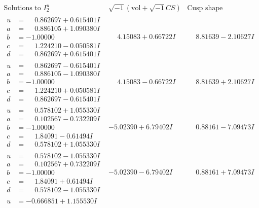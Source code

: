 \documentclass[1p]{elsarticle_modified}
\theoremstyle{definition}
\newcommand{\I}{\sqrt{-1}}
\begin{document}
$$\begin{array}{c|c|c}  
\text{Solutions to }I^u_{2}& \I (\text{vol} + \sqrt{-1}CS) & \text{Cusp shape}\\
 \hline 
\begin{aligned}
u &= \phantom{-}0.862697 + 0.615401 I \\
a &= \phantom{-}0.886105 + 1.090380 I \\
b &= -1.00000\phantom{ +0.000000I} \\
c &= \phantom{-}1.224210 - 0.050581 I \\
d &= \phantom{-}0.862697 + 0.615401 I\end{aligned}
 & \phantom{-}4.15083 + 0.66722 I & \phantom{-}8.81639 - 2.10627 I \\ \hline\begin{aligned}
u &= \phantom{-}0.862697 - 0.615401 I \\
a &= \phantom{-}0.886105 - 1.090380 I \\
b &= -1.00000\phantom{ +0.000000I} \\
c &= \phantom{-}1.224210 + 0.050581 I \\
d &= \phantom{-}0.862697 - 0.615401 I\end{aligned}
 & \phantom{-}4.15083 - 0.66722 I & \phantom{-}8.81639 + 2.10627 I \\ \hline\begin{aligned}
u &= \phantom{-}0.578102 + 1.055330 I \\
a &= \phantom{-}0.102567 - 0.732209 I \\
b &= -1.00000\phantom{ +0.000000I} \\
c &= \phantom{-}1.84091 - 0.61494 I \\
d &= \phantom{-}0.578102 + 1.055330 I\end{aligned}
 & -5.02390 + 6.79402 I & \phantom{-}0.88161 - 7.09473 I \\ \hline\begin{aligned}
u &= \phantom{-}0.578102 - 1.055330 I \\
a &= \phantom{-}0.102567 + 0.732209 I \\
b &= -1.00000\phantom{ +0.000000I} \\
c &= \phantom{-}1.84091 + 0.61494 I \\
d &= \phantom{-}0.578102 - 1.055330 I\end{aligned}
 & -5.02390 - 6.79402 I & \phantom{-}0.88161 + 7.09473 I \\ \hline\begin{aligned}
u &= -0.666851 + 1.155530 I \\

\end{aligned}
\end{array}$$
\end{document}
